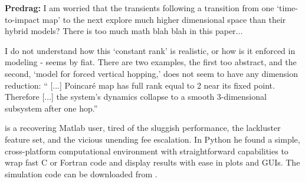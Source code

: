 \begin{description}
{\bf Predrag:} I am worried that the transients following a transition from one
`time-to-impact map' to the next explore much higher dimensional space
than their hybrid models? There is too much math blah blah in this paper...

I do not understand how this `constant rank' is realistic, or
how is it enforced in modeling - seems by fiat. There are two examples,
the first too abstract, and the second, `model for forced
vertical hopping,' does not seem to have any dimension reduction:
``
[...]
Poincar\'e map has full rank equal to 2 near its fixed point.
Therefore
[...] the system's dynamics collapse
to a smooth 3-dimensional subsystem after one hop.''


 is a
recovering Matlab user, tired of the sluggish performance, the lackluster
feature set, and the vicious unending fee escalation. In Python he found
a simple, cross-platform computational environment with straightforward
capabilities to wrap fast C or Fortran code and display results with ease
in plots and GUIs. The simulation code can be downloaded from
.


\end{description}

\renewcommand{\ssp}{a}
